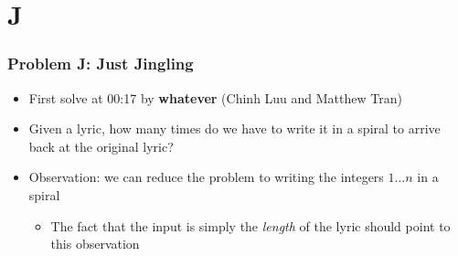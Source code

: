 \section{J}%
 \setcounter{MaxMatrixCols}{20}
\label{sec:j}

\begin{frame}
  \frametitle{Problem J: Just Jingling}

  \begin{itemize}
    \item First solve at 00:17 by \textbf{whatever} (Chinh Luu and Matthew Tran)
    \item Given a lyric, how many times do we have to write it in a spiral to arrive back at the original lyric?
    \item Observation: we can reduce the problem to writing the integers $1\dots n$ in a spiral
      \begin{itemize}
        \item The fact that the input is simply the \textit{length} of the lyric should point to this observation
      \end{itemize}
  \end{itemize}
\end{frame}

